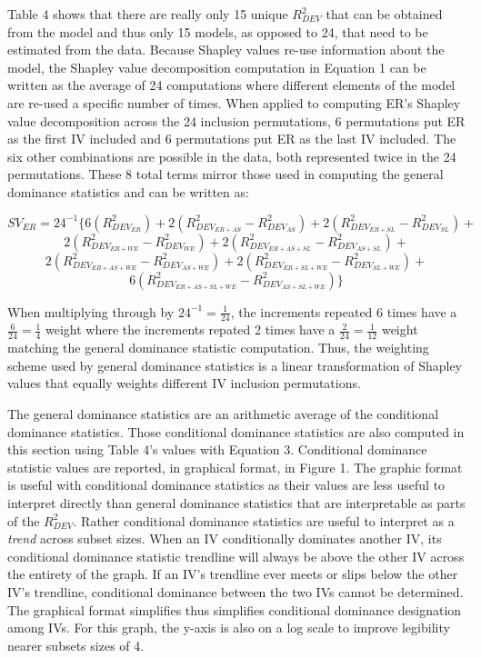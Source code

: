 \documentclass[ShortAfour,times,sageapa]{sagej}
\begin{document}
	Table 4 shows that there are really only 15 unique $R^2_{DEV}$ that can be obtained from the model and thus only 15 models, as opposed to 24, that need to be estimated from the data.
	Because Shapley values re-use information about the model, the Shapley value decomposition computation in Equation 1 can be written as the average of 24 computations where different elements of the model are re-used a specific number of times.
	When applied to computing ER's Shapley value decomposition across the 24 inclusion permutations, 6 permutations put ER as the first IV included and 6 permutations put ER as the last IV included.
	The six other combinations are possible in the data, both represented twice in the 24 permutations.
	These 8 total terms mirror those used in computing the general dominance statistics and can be written as:
	
	$$SV_{ER} = 24^{-1}\{6(R^2_{DEV_{ER}}) + 2(R^2_{DEV_{ER + AS}} - R^2_{DEV_{AS}}) + 2(R^2_{DEV_{ER + SL}} - R^2_{DEV_{SL}}) + $$
	$$2(R^2_{DEV_{ER + WE}} - R^2_{DEV_{WE}}) + 2(R^2_{DEV_{ER + AS + SL}} - R^2_{DEV_{AS + SL}}) + $$ 
	$$2(R^2_{DEV_{ER + AS + WE}} - R^2_{DEV_{AS + WE}}) + 2(R^2_{DEV_{ER + SL + WE}} - R^2_{DEV_{SL + WE}}) + $$
	$$6(R^2_{DEV_{ER + AS + SL + WE}} - R^2_{DEV_{AS + SL + WE}})\}$$
	
	When multiplying through by $24^{-1} = \frac{1}{24}$, the increments repeated 6 times have a $\frac{6}{24} = \frac{1}{4}$ weight where the increments repated 2 times have a $\frac{2}{24} = \frac{1}{12}$ weight matching the general dominance statistic computation.
	Thus, the weighting scheme used by general dominance statistics is a linear transformation of Shapley values that equally weights different IV inclusion permutations.
	
	The general dominance statistics are an arithmetic average of the conditional dominance statistics.
	Those conditional dominance statistics are also computed in this section using Table 4's values with Equation 3. 
	Conditional dominance statistic values are reported, in graphical format, in Figure 1. 
	The graphic format is useful with conditional dominance statistics as their values are less useful to interpret directly than general dominance statistics that are interpretable as parts of the $R^2_{DEV}$.
	Rather conditional dominance statistics are useful to interpret as a \emph{trend} across subset sizes.
	When an IV conditionally dominates another IV, its conditional dominance statistic trendline will always be above the other IV across the entirety of the graph.
	If an IV's trendline ever meets or slips below the other IV's trendline, conditional dominance between the two IVs cannot be determined.
	The graphical format simplifies thus simplifies conditional dominance designation among IVs.
	For this graph, the y-axis is also on a log scale to improve legibility nearer subsets sizes of 4.
	
\end{document}
